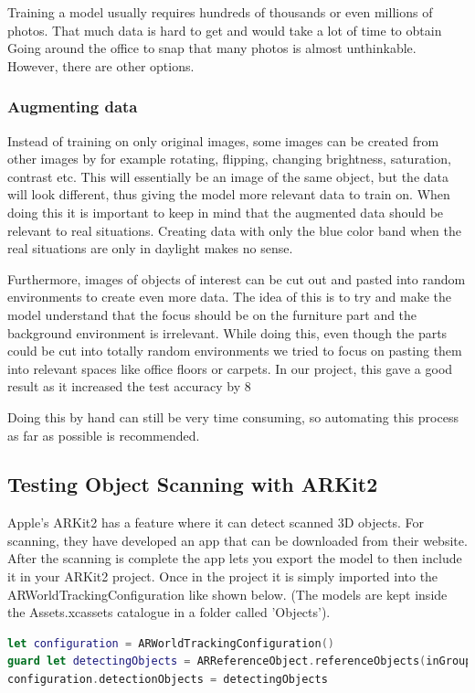 Training a model usually requires hundreds of thousands or even millions of photos. That much data is hard to get and would take a lot of time to obtain Going around the office to snap that many photos is almost unthinkable.
However, there are other options.

\subsubsection{Augmenting data}
Instead of training on only original images, some images can be created from other images by for example rotating, flipping, changing brightness, saturation, contrast etc.  This will essentially be an image of the same object, but the data will look different, thus giving the model more relevant data to train on.
When doing this it is important to keep in mind that the augmented data should be relevant to real situations.
Creating data with only the blue color band when the real situations are only in daylight makes no sense.

Furthermore, images of objects of interest can be cut out and pasted into random environments to create even more data.
The idea of this is to try and make the model understand that the focus should be on the furniture part and the background environment is irrelevant. While doing this, even though the parts could be cut into totally random environments we tried to focus on pasting them into relevant spaces like office floors or carpets.
In our project, this gave a good result as it increased the test accuracy by 8%

Doing this by hand can still be very time consuming, so automating this process as far as possible is recommended.

\subsection{Testing Object Scanning with ARKit2}
Apple's ARKit2 has a feature where it can detect scanned 3D objects. For scanning, they have developed an app that can be downloaded from their website. \cite{ARScanning}
After the scanning is complete the app lets you export the model to then include it in your ARKit2 project. Once in the project it is simply imported into the ARWorldTrackingConfiguration like shown below. (The models are kept inside the Assets.xcassets catalogue in a folder called 'Objects').

\begin{lstlisting}[language=swift]
let configuration = ARWorldTrackingConfiguration()
guard let detectingObjects = ARReferenceObject.referenceObjects(inGroupNamed: "Objects", bundle: nil) else { return }
configuration.detectionObjects = detectingObjects
\end{lstlisting}

